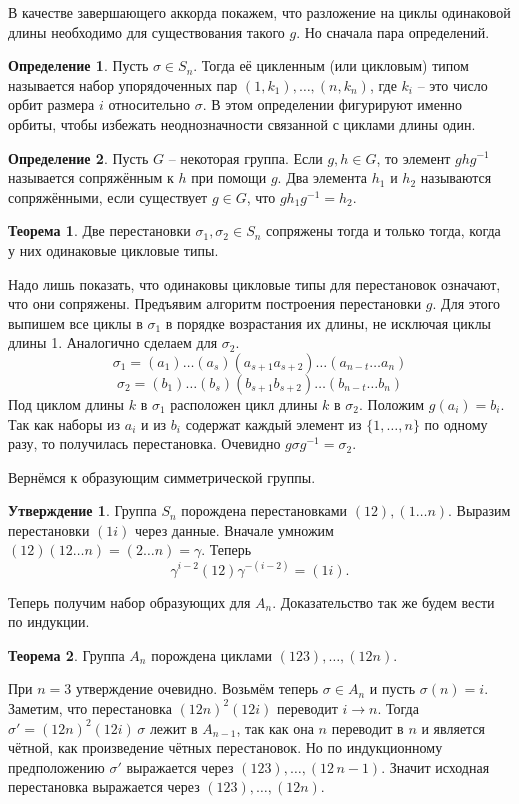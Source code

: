 \documentclass[10pt,a4paper,oneside]{book}
\theoremstyle{definition}
\newtheorem*{defn}{\color{yellow!30!red} Определение}
\newtheorem{thm}{\color{red!40!black}Теорема}
\newtheorem{utvr}{\color{blue!50!black}Утверждение}
\def\thrm{\begin{thm}}
\def\ethrm{\end{thm}}
\def\dfn{\begin{defn}}
\def\edfn{\end{defn}}
\def\utv{\begin{utvr}}
\def\eutv{\end{utvr}}
\begin{document}
В качестве завершающего аккорда покажем, что разложение на циклы одинаковой длины необходимо для существования такого $g$. Но сначала пара определений.
\dfn Пусть $\sigma \in S_n$. Тогда её цикленным (или цикловым) типом называется набор упорядоченных пар $(1,k_1),\dots, (n,k_n)$, где $k_i$ -- это число орбит размера $i$ относительно $\sigma$. В этом определении фигурируют именно орбиты, чтобы избежать неоднозначности связанной с циклами длины один.
\edfn

\dfn Пусть $G$ -- некоторая группа. Если $g,h\in G$, то элемент $ghg^{-1}$ называется сопряжённым к $h$ при помощи $g$. Два элемента $h_1$ и $h_2$ называются сопряжёнными, если существует $g \in G$, что $gh_1g^{-1}=h_2$.
\edfn 

\thrm Две перестановки $\sigma_1,\sigma_2\in S_n$ сопряжены тогда и только тогда, когда у них одинаковые цикловые типы.
\ethrm
\proof Надо лишь показать, что одинаковы цикловые типы для перестановок означают, что они сопряжены. Предъявим алгоритм построения перестановки $g$. Для этого выпишем все циклы в $\sigma_1$ в порядке возрастания их длины, не исключая циклы длины 1. Аналогично сделаем для $\sigma_2$. 
$$\sigma_1=(a_1)\dots(a_s)(a_{s+1}a_{s+2})\dots (a_{n-t}\dots a_n)$$
$$\sigma_2=(b_1)\dots(b_s)(b_{s+1}b_{s+2})\dots (b_{n-t}\dots b_n)$$
Под циклом длины $k$ в $\sigma_1$ расположен цикл длины $k$ в $\sigma_2$. Положим $g(a_i)=b_i$. Так как наборы из $a_i$ и из $b_i$ содержат каждый элемент из $\{1,\dots,n\}$ по одному разу, то получилась перестановка. Очевидно $g\sigma g^{-1}=\sigma_2$.
\endproof

Вернёмся к образующим симметрической группы.

\utv Группа $S_n$ порождена перестановками $(12), (1 \dots n)$. 
\proof Выразим перестановки $(1i)$ через данные. Вначале умножим $(12)(12\dots n)=(2\dots n)=\gamma$. Теперь
$$\gamma^{i-2}(12)\gamma^{-(i-2)}=(1i).$$
\endproof
\eutv

Теперь получим набор образующих для $A_n$. Доказательство так же будем вести по индукции.


\thrm Группа $A_n$ порождена циклами $(123),\dots,(12n)$. 
\ethrm
\proof При $n=3$ утверждение очевидно. Возьмём теперь $\sigma\in A_n$ и пусть $\sigma(n)=i$. Заметим, что перестановка $(12n)^2(12i)$ переводит $i\to n$. Тогда $\sigma'=(12n)^2(12i) \,\sigma$ лежит в  $A_{n-1}$, так как она $n$ переводит в $n$ и является чётной, как произведение чётных перестановок. Но по индукционному предположению $\sigma'$ выражается через $(123),\dots,(12\,n-1)$. Значит исходная перестановка выражается через $(123),\dots,(12n)$.
\endproof
\end{document}
